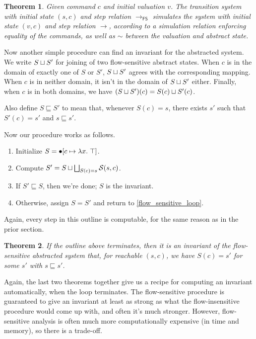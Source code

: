 \documentclass{amsbook}
\newtheorem{theorem}{Theorem}[chapter]
\theoremstyle{definition}
\theoremstyle{remark}
\numberwithin{section}{chapter}
\numberwithin{equation}{chapter}
\begin{document}
\begin{theorem}\label{flow_sensitive_abstraction}
  \abstraction
  Given command $c$ and initial valuation $v$.  The transition system with initial state $(s, c)$ and step relation $\to_\mathsf{FS}$ simulates the system with initial state $(v, c)$ and step relation $\to$, according to a simulation relation enforcing equality of the commands, as well as $\sim$ between the valuation and abstract state.
\end{theorem}

Now another simple procedure can find an invariant for the abstracted system.
We write $S \sqcup S'$ for joining of two flow-sensitive abstract states.
When $c$ is in the domain of exactly one of $S$ or $S'$, $S \sqcup S'$ agrees with the corresponding mapping.
When $c$ is in neither domain, it isn't in the domain of $S \sqcup S'$ either.
Finally, when $c$ is in both domains, we have $(S \sqcup S')(c) = S(c) \sqcup S'(c)$.

Also define $S \sqsubseteq S'$ to mean that, whenever $S(c) = s$, there exists $s'$ such that $S'(c) = s'$ and $s \sqsubseteq s'$.

Now our procedure works as follows.

\begin{enumerate}
\item Initialize $S = \bullet[c \mapsto \lambda x. \; \top]$.
\item \label{flow_sensitive_loop}Compute $S' = S \sqcup \bigsqcup_{S(c) = s} \mathcal S(s, c)$.
\item If $S' \sqsubseteq S$, then we're done; $S$ is the invariant.
\item Otherwise, assign $S = S'$ and return to \ref{flow_sensitive_loop}.
\end{enumerate}

Again, every step in this outline is computable, for the same reason as in the prior section.

\begin{theorem}\label{flow_sensitive_iteration}
  \invariants
  If the outline above terminates, then it is an invariant of the flow-sensitive abstracted system that, for reachable $(s, c)$, we have $S(c) = s'$ for some $s'$ with $s \sqsubseteq s'$.
\end{theorem}

Again, the last two theorems together give us a recipe for computing an invariant automatically, when the loop terminates.
The flow-sensitive procedure is guaranteed to give an invariant at least as strong as what the flow-insensitive procedure would come up with, and often it's much stronger.
However, flow-sensitive analysis is often much more computationally expensive (in time and memory), so there is a trade-off.
\end{document}

